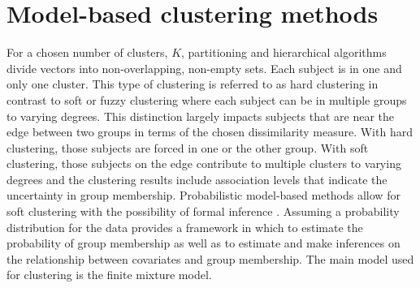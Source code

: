 \section{Model-based clustering methods}
For a chosen number of clusters, $K$, partitioning and hierarchical algorithms divide vectors into non-overlapping, non-empty sets. Each subject is in one and only one cluster. This type of clustering is referred to as hard clustering in contrast to soft or fuzzy clustering where each subject can be in multiple groups to varying degrees. This distinction largely impacts subjects that are near the edge between two groups in terms of the chosen dissimilarity measure. With hard clustering, those subjects are forced in one or the other group. With soft clustering, those subjects on the edge contribute to multiple clusters to varying degrees and the clustering results include association levels that indicate the uncertainty in group membership. Probabilistic model-based methods allow for soft clustering with the possibility of formal inference \cite{fraley2002}. Assuming a probability distribution for the data provides a framework in which to estimate the probability of group membership as well as to estimate and make inferences on the relationship between covariates and group membership. The main model used for clustering is the finite mixture model.

